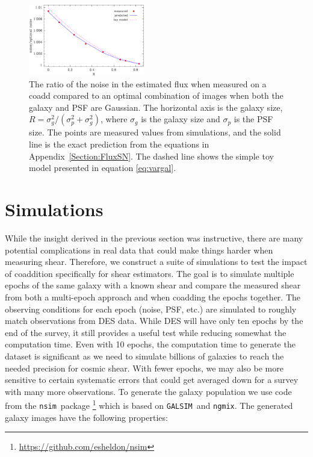 \documentclass[fleqn,useAMS,usenatbib]{mnras}
\newcommand{\galsim}{\texttt{GALSIM}}
\newcommand{\ngmix}{\texttt{ngmix}}
\newcommand{\nnsim}{\texttt{nsim}}
\begin{document}
\begin{figure}
\includegraphics[width=0.45\textwidth]{toy-model.png}
\caption{The ratio of the noise in the estimated flux when measured on a coadd 
compared to an optimal combination of images when both the galaxy and PSF are Gaussian.
The horizontal axis is the galaxy size, $R=\sigma_g^2/(\sigma_p^2 + \sigma_g^2)$,
where $\sigma_g$ is the galaxy size and $\sigma_p$ is the PSF size.
The points are measured values from simulations, and the solid line is the exact 
prediction from the equations in Appendix~\ref{Section:FluxSN}.  The dashed line shows 
the simple toy model presented in equation \ref{eq:vargal}.}
\end{figure}

\section{Simulations}
\label{Section:Simulation}
While the insight derived in the previous section was instructive, there are 
many potential complications in real data that could make things harder when 
measuring shear.  Therefore, we construct a suite of simulations to test the 
impact of coaddition specifically for shear estimators.  The goal is to 
simulate multiple epochs of the same galaxy with a known shear and compare the 
measured shear from both a multi-epoch approach and when coadding the epochs 
together.  The observing conditions for each epoch (noise, PSF, etc.) are 
simulated to roughly match observations from DES data.  While DES will have 
only ten epochs by the end of the survey, it still provides a useful test while 
reducing somewhat the computation time.  Even with 10 epochs, the computation 
time to generate the dataset is significant as we need to simulate billions of 
galaxies to reach the needed precision for cosmic shear.  With fewer epochs, we 
may also be more sensitive to certain systematic errors that could get averaged 
down for a survey with many more observations.
To generate the galaxy population we use code from the \nnsim\ package 
\footnote{\url{https://github.com/esheldon/nsim}} which is based on \galsim\ 
and \ngmix.  The generated galaxy images have the following properties:
\end{document}
